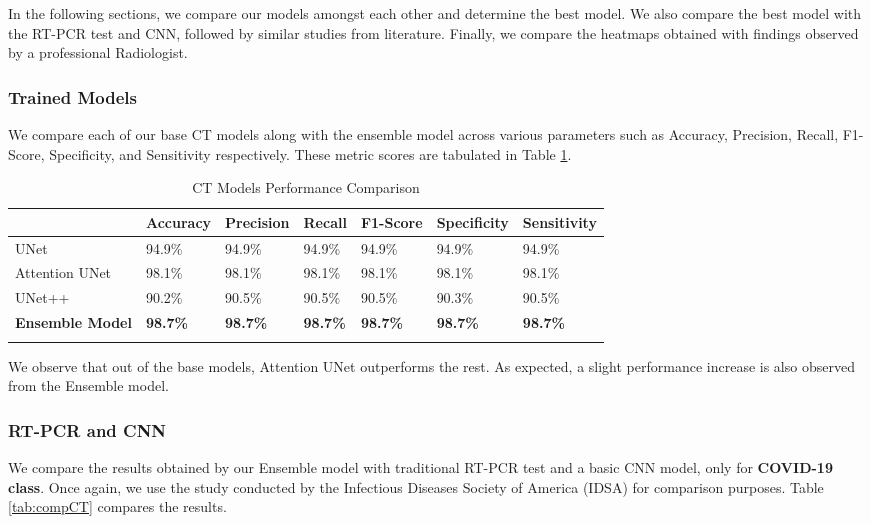 In the following sections, we compare our models amongst each other and determine the best model. We also compare the best model with the RT-PCR test and CNN, followed by similar studies from literature. Finally, we compare the heatmaps obtained with findings observed by a professional Radiologist.

\subsubsection{Trained Models}

We compare each of our base CT models along with the ensemble model across various parameters such as Accuracy, Precision, Recall, F1-Score, Specificity, and Sensitivity respectively. These metric scores are tabulated in Table \ref{tab:mpcCT}.

\vspace{1em}
 \begin{longtable}{| p{} |  p{} |   p{} | p{} | p{} | p{} | p{} |} 
    \hline
& \textbf{Accuracy} & \textbf{Precision} & \textbf{Recall} & \textbf{F1-Score} & \textbf{Specificity} & \textbf{Sensitivity} \\
\hline
			UNet    &94.9\%   &94.9\%    &94.9\%    &94.9\%   &94.9\%   &94.9\% 
\\\hline
			Attention UNet    &98.1\%   &98.1\%    &98.1\%    &98.1\%   &98.1\%   &98.1\% 
\\\hline
			UNet++    &90.2\%   &90.5\%    &90.5\%    &90.5\%   &90.3\%   &90.5\% 
\\\hline
	        \textbf{Ensemble Model}    &\textbf{98.7\%}   &\textbf{98.7\%}    &\textbf{98.7\%}    &\textbf{98.7\%}   &\textbf{98.7\%}   &\textbf{98.7\%} 
\\\hline
 \caption{CT Models Performance Comparison}  \label{tab:mpcCT}

    \end{longtable}
\vspace{-1em}
We observe that out of the base models, Attention UNet outperforms the rest. As expected, a slight performance increase is also observed from the Ensemble model.

\subsubsection{RT-PCR and CNN}

We compare the results obtained by our Ensemble model with traditional RT-PCR test and a basic CNN model, only for \textbf{COVID-19 class}. Once again, we use the study conducted by the Infectious Diseases Society of America (IDSA) \cite{IDS2020} for comparison purposes. Table \ref{tab:compCT} compares the results.

